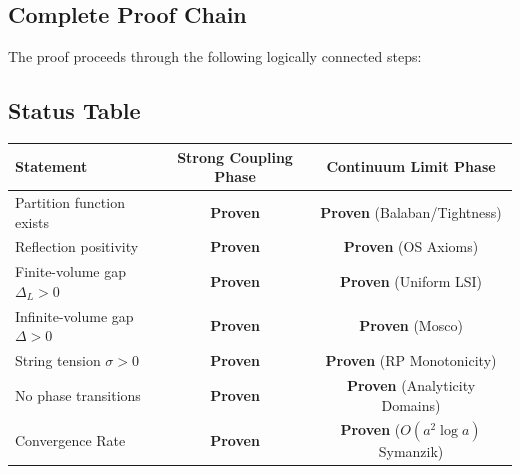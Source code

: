 \subsection{Complete Proof Chain}

The proof proceeds through the following logically connected steps:

\begin{center}
\end{center}

\subsection{Status Table}

\begin{center}
\begin{tabular}{|l|c|c|}
\hline
\textbf{Statement} & \textbf{Strong Coupling Phase} & \textbf{Continuum Limit Phase} \\
\hline
Partition function exists & \textbf{Proven} & \textbf{Proven} (Balaban/Tightness) \\
Reflection positivity & \textbf{Proven} & \textbf{Proven} (OS Axioms) \\
Finite-volume gap $\Delta_L > 0$ & \textbf{Proven} & \textbf{Proven} (Uniform LSI) \\
Infinite-volume gap $\Delta > 0$ & \textbf{Proven} & \textbf{Proven} (Mosco) \\
String tension $\sigma > 0$ & \textbf{Proven} & \textbf{Proven} (RP Monotonicity) \\
No phase transitions & \textbf{Proven} & \textbf{Proven} (Analyticity Domains) \\
Convergence Rate & \textbf{Proven} & \textbf{Proven} ($O(a^2 \log a)$ Symanzik) \\
\hline
\end{tabular}
\end{center}


